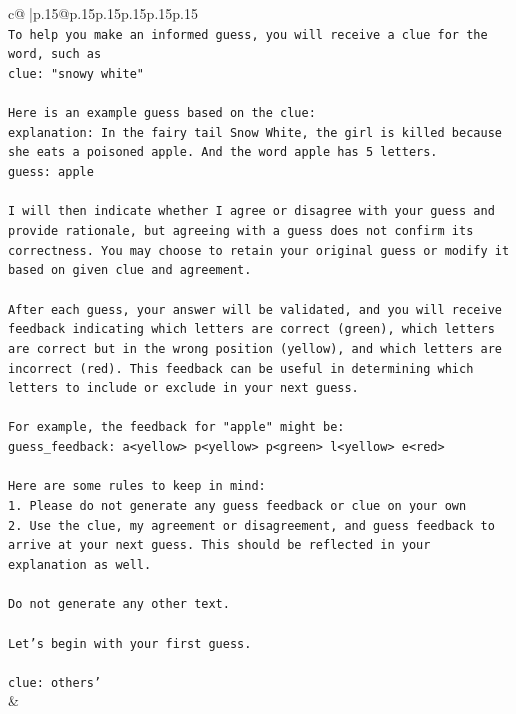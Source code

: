 \documentclass{article}
\begin{document}
{\begin{supertabular}{c@{$\;$}|p{.15\linewidth}@{}p{.15\linewidth}p{.15\linewidth}p{.15\linewidth}p{.15\linewidth}p{.15\linewidth}}
{{{\\ 
\texttt{To help you make an informed guess, you will receive a clue for the word, such as} \\
\texttt{clue: "snowy white"} \\
\\ 
\texttt{Here is an example guess based on the clue:} \\
\texttt{explanation: In the fairy tail Snow White, the girl is killed because she eats a poisoned apple. And the word apple has 5 letters.} \\
\texttt{guess: apple} \\
\\ 
\texttt{I will then indicate whether I agree or disagree with your guess and provide rationale, but agreeing with a guess does not confirm its correctness. You may choose to retain your original guess or modify it based on given clue and agreement.} \\
\\ 
\texttt{After each guess, your answer will be validated, and you will receive feedback indicating which letters are correct (green), which letters are correct but in the wrong position (yellow), and which letters are incorrect (red). This feedback can be useful in determining which letters to include or exclude in your next guess.} \\
\\ 
\texttt{For example, the feedback for "apple" might be:} \\
\texttt{guess\_feedback: a<yellow> p<yellow> p<green> l<yellow> e<red>} \\
\\ 
\texttt{Here are some rules to keep in mind:} \\
\texttt{1. Please do not generate any guess feedback or clue on your own} \\
\texttt{2. Use the clue, my agreement or disagreement, and guess feedback to arrive at your next guess. This should be reflected in your explanation as well.} \\
\\ 
\texttt{Do not generate any other text.} \\
\\ 
\texttt{Let's begin with your first guess.} \\
\\ 
\texttt{clue: others'} \\
            }
        }
    }
    & \\ \\


\end{supertabular}}
\end{document}
